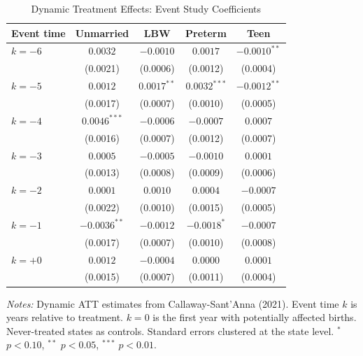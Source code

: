 \begin{table}[H]
\centering
\caption{Dynamic Treatment Effects: Event Study Coefficients}
\begin{threeparttable}
\begin{tabular}{lcccc}
\toprule
Event time & Unmarried & LBW & Preterm & Teen \\
\midrule
$k = -6$ & $0.0032$ & $-0.0010$ & $0.0017$ & $-0.0010^{**}$ \\
 & (0.0021) & (0.0006) & (0.0012) & (0.0004) \\
$k = -5$ & $0.0012$ & $0.0017^{**}$ & $0.0032^{***}$ & $-0.0012^{**}$ \\
 & (0.0017) & (0.0007) & (0.0010) & (0.0005) \\
$k = -4$ & $0.0046^{***}$ & $-0.0006$ & $-0.0007$ & $0.0007$ \\
 & (0.0016) & (0.0007) & (0.0012) & (0.0007) \\
$k = -3$ & $0.0005$ & $-0.0005$ & $-0.0010$ & $0.0001$ \\
 & (0.0013) & (0.0008) & (0.0009) & (0.0006) \\
$k = -2$ & $0.0001$ & $0.0010$ & $0.0004$ & $-0.0007$ \\
 & (0.0022) & (0.0010) & (0.0015) & (0.0005) \\
$k = -1$ & $-0.0036^{**}$ & $-0.0012$ & $-0.0018^{*}$ & $-0.0007$ \\
 & (0.0017) & (0.0007) & (0.0010) & (0.0008) \\[0.3em]
$k = +0$ & $0.0012$ & $-0.0004$ & $0.0000$ & $0.0001$ \\
 & (0.0015) & (0.0007) & (0.0011) & (0.0004) \\
\bottomrule
\end{tabular}
\begin{tablenotes}[flushleft]
\small
\item \textit{Notes:} Dynamic ATT estimates from Callaway-Sant'Anna (2021). Event time $k$ is years relative to treatment. $k=0$ is the first year with potentially affected births. Never-treated states as controls. Standard errors clustered at the state level. $^{*}$ $p<0.10$, $^{**}$ $p<0.05$, $^{***}$ $p<0.01$.
\end{tablenotes}
\end{threeparttable}
\label{tab:event_study}
\end{table}
